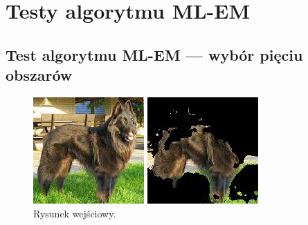 \documentclass[10pt]{llncs}
\begin{document}
\section{Testy algorytmu ML-EM}

\subsection{Test algorytmu ML-EM --- wybór pięciu obszarów}

\begin{figure}[!htb]
  \includegraphics[width=\linewidth]{img/images.jpg}
  \caption{Rysunek wejściowy.}\label{fig:10}
\endminipage\hfill
{}
  \includegraphics[width=\linewidth]{img/images_k5_0.jpg}

\end{figure}
\end{document}
